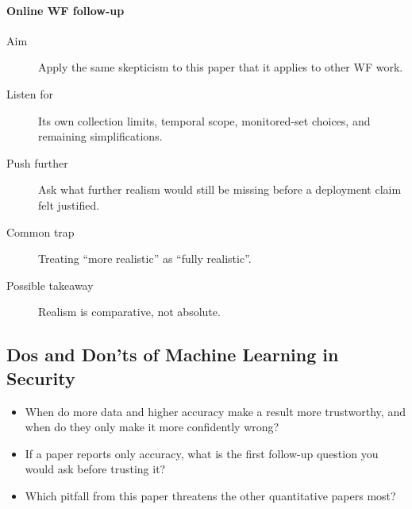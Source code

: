 \paragraph{Online WF follow-up}
\begin{description}
  \item[Aim] Apply the same skepticism to this paper that it applies to other
    WF work.
  \item[Listen for] Its own collection limits, temporal scope, monitored-set
    choices, and remaining simplifications.
  \item[Push further] Ask what further realism would still be missing before a
    deployment claim felt justified.
  \item[Common trap] Treating \enquote{more realistic} as \enquote{fully
    realistic}.
  \item[Possible takeaway] Realism is comparative, not absolute.
\end{description}

\subsection{Dos and Don'ts of Machine Learning in Security}

\begin{frame}
  \begin{question}
    \begin{itemize}
      \item When do more data and higher accuracy make a result more
        trustworthy, and when do they only make it more confidently wrong?
      \item If a paper reports only accuracy, what is the first follow-up
        question you would ask before trusting it?
      \item Which pitfall from this paper threatens the other quantitative
        papers most?
    \end{itemize}
  \end{question}
\end{frame}

